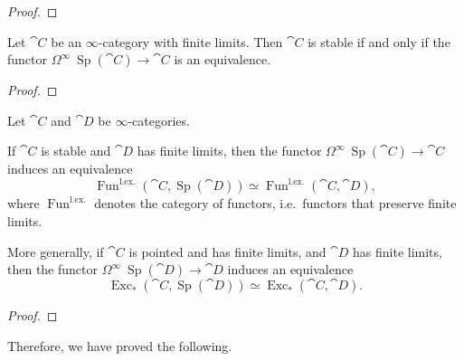 \begin{proof}
    \nyw
\end{proof}

\begin{proposition}
    Let $\cat{C}$ be an $\infty$-category with finite limits.
    Then $\cat{C}$ is stable if and only if the functor 
    $\Omega^\infty\:\operatorname{Sp}(\cat{C})\to\cat{C}$
    is an equivalence.
\end{proposition}

\begin{proof}
    \nyw
\end{proof}

\begin{proposition}
    Let $\cat{C}$ and $\cat{D}$ be $\infty$-categories.

    \begin{itms}
        \item 
        If $\cat{C}$ is stable and $\cat{D}$ has finite limits,
        then the functor $\Omega^\infty\:\operatorname{Sp}(\cat{C})\to\cat{C}$
        induces an equivalence
        \[\operatorname{Fun}^{\mathrm{l.ex.}}(\cat{C},\operatorname{Sp}(\cat{D}))
        \simeq\operatorname{Fun}^{\mathrm{l.ex.}}(\cat{C},\cat{D}),\]
        where $\operatorname{Fun}^{\mathrm{l.ex.}}$
        denotes the category of  functors,
        i.e.\ functors that preserve finite limits.
        \item 
        More generally, if $\cat{C}$ is pointed and has finite limits,
        and $\cat{D}$ has finite limits, then the functor
        $\Omega^\infty\:\operatorname{Sp}(\cat{D})\to\cat{D}$
        induces an equivalence
        \[\operatorname{Exc}_*(\cat{C},\operatorname{Sp}(\cat{D}))
        \simeq\operatorname{Exc}_*(\cat{C},\cat{D}).\]
    \end{itms}
\end{proposition}

\begin{proof}
    \nyw
\end{proof}

Therefore, we have proved the following.

